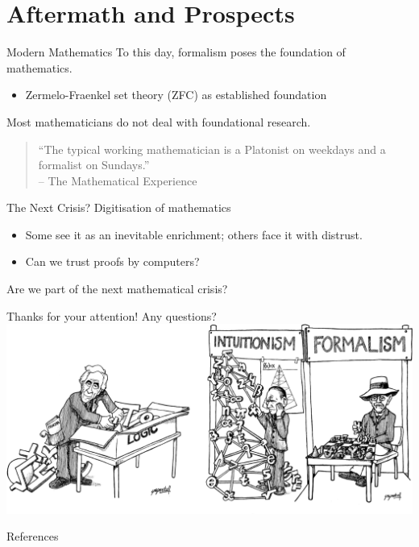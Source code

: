\documentclass{beamer}
\begin{document}
\section{Aftermath and Prospects}
\begin{frame}{Modern Mathematics}
To this day, formalism poses the foundation of mathematics.
\pause
\begin{itemize}
	\item Zermelo-Fraenkel set theory (ZFC) as established foundation
\end{itemize}
\pause
Most mathematicians do not deal with foundational research.
\pause
\begin{quote}
``The typical working mathematician is a Platonist on weekdays and a formalist on Sundays.''\nocite{math_experience}\\\hfill-- The Mathematical Experience
\end{quote}
\end{frame}
\begin{frame}{The Next Crisis?}
Digitisation of mathematics
\pause
    \begin{itemize}[<+->]
	\item Some see it as an inevitable enrichment; others face it with distrust.
	\item Can we trust proofs by computers?
    \end{itemize}
\pause[\thebeamerpauses]
\vspace{\baselineskip}
\centerline{\Large\alert{Are we part of the next mathematical crisis?}}
\end{frame}
\begin{frame}
	\center
	\Large{Thanks for your attention! Any questions?}
	\vspace{0.5\baselineskip}\\
	\includegraphics[height=0.6\textheight]{img/logic_intuit_form2.png}
\end{frame}
\begin{frame}[allowframebreaks]{References}
  
  
\end{frame}
\end{document}
